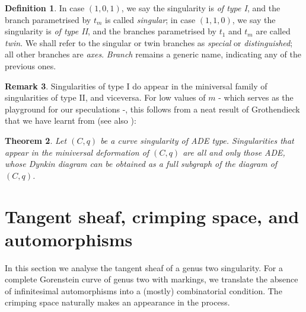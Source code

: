 \documentclass[11pt]{amsart}
\theoremstyle{plain}
\newtheorem{thm}{Theorem}[section]
\theoremstyle{definition}
\newtheorem{dfn}[thm]{Definition}
\newtheorem{rem}[thm]{Remark}
\begin{document}

\begin{dfn}\label{def:special_branches}
 In case $(1,0,1)$, we say the singularity is \emph{of type I}, and the branch parametrised by $t_m$ is called \emph{singular}; in case $(1,1,0)$, we say the singularity is \emph{of type II}, and the branches parametrised by $t_1$ and $t_m$ are called \emph{twin}. We shall refer to the singular or twin branches as \emph{special} or \emph{distinguished}; all other branches are \emph{axes}. \emph{Branch} remains a generic name, indicating any of the previous ones.
\end{dfn}

\begin{rem}
 Singularities of type I do appear in the miniversal family of singularities of type II, and viceversa. For low values of $m$ - which serves as the playground for our speculations -, this follows from a neat result of Grothendieck that we have learnt from \cite{C-ML} (see also \cite{Arnold,Demazure}):
 \begin{thm}\label{thm:ADE}
  Let $(C,q)$ be a curve singularity of ADE type. Singularities that appear in the miniversal deformation of $(C,q)$ are all and only those ADE, whose Dynkin diagram can be obtained as a full subgraph of the diagram of $(C,q)$.
 \end{thm}
\end{rem}


\section{Tangent sheaf, crimping space, and automorphisms}\label{sec:crimp}
In this section we analyse the tangent sheaf of a genus two singularity. For a complete Gorenstein curve of genus two with markings, we translate the absence of infinitesimal automorphisms into a (mostly) combinatorial condition. The crimping space naturally makes an appearance in the process.
\end{document}
